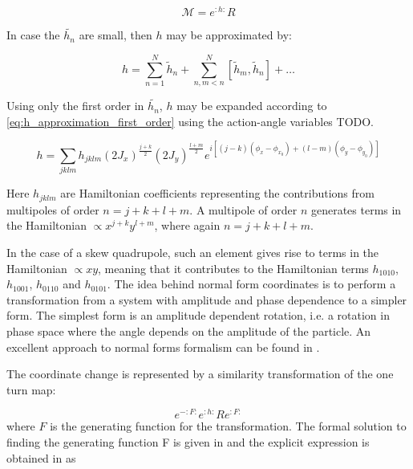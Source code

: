 \begin{equation}
    \mathcal{M} = e^{:h:} R
\end{equation}

In case the \(\tilde{h_{n}}\) are small, then \(h\) may be approximated by:

\begin{equation}
    h = \sum_{n=1}^{N} \tilde{h}_{n} + \sum_{n, m<n}^{N} \left[\tilde{h}_{m}, \tilde{h}_{n} \right] + \ldots
    \label{eq:h_expansion}
\end{equation}

Using only the first order in \(\tilde{h_{n}}\), \(h\) may be expanded according to \cref{eq:h_approximation_first_order} using the action-angle variables TODO.

\begin{equation}
    h = \sum_{j k l m} h_{j k l m} \left(2 J_{x}\right)^{\frac{j+k}{2}} \left(2 J_{y}\right)^{\frac{l+m}{2}} e^{i \left[(j-k)\left(\phi_{x}-\phi_{x_{0}}\right) + (l-m)\left(\phi_{y}-\phi_{y_{0}}\right) \right]}
    \label{eq:h_approximation_first_order}
\end{equation}

Here \(h_{j k l m}\) are Hamiltonian coefficients representing the contributions from multipoles of order \(n = j + k + l + m\).
A multipole of order \(n\) generates terms in the Hamiltonian \(\propto x^{j+k} y^{l+m}\), where again \(n = j + k + l + m\).

In the case of a skew quadrupole, such an element gives rise to terms in the Hamiltonian \(\propto xy\), meaning that it contributes to the Hamiltonian terms \(h_{1010}\), \(h_{1001}\), \(h_{0110}\) and \(h_{0101}\).
The idea behind normal form coordinates is to perform a transformation from a system with amplitude and phase dependence to a simpler form.
The simplest form is an amplitude dependent rotation, i.e. a rotation in phase space where the angle depends on the amplitude of the particle.
An excellent approach to normal forms formalism can be found in \cite{Carlier_thesis}.

The coordinate change is represented by a similarity transformation of the one turn map:

\begin{equation}
    e^{-: F:} e^{: h:} R e^{: F:}
\end{equation}
where \(F\) is the generating function for the transformation.
The formal solution to finding the generating function F is given in \cite{Forest_normal_forms} and the explicit expression is obtained in \cite{Tomas_thesis} as

